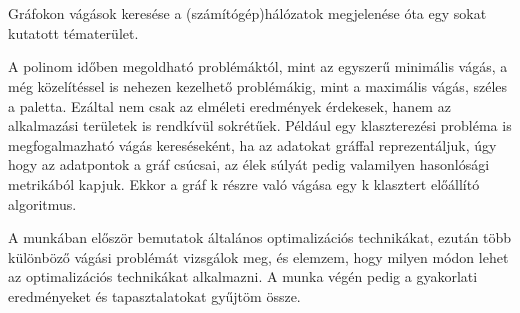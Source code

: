 \chapter{\bevezetes}

Gráfokon vágások keresése a (számítógép)hálózatok megjelenése óta egy sokat kutatott tématerület.

A polinom időben megoldható problémáktól, mint az egyszerű minimális vágás, a még közelítéssel
is nehezen kezelhető problémákig, mint a maximális vágás, széles a paletta. Ezáltal nem csak az elméleti eredmények érdekesek, hanem az alkalmazási területek is rendkívül sokrétűek. Például egy
klaszterezési probléma is megfogalmazható vágás kereséseként, ha az adatokat gráffal reprezentáljuk, úgy hogy az adatpontok a gráf csúcsai, az élek súlyát pedig valamilyen hasonlósági metrikából kapjuk. Ekkor a gráf k részre való vágása egy k klasztert előállító algoritmus.

A munkában először bemutatok általános optimalizációs technikákat, ezután több különböző vágási problémát vizsgálok meg, és elemzem, hogy milyen módon lehet az optimalizációs technikákat alkalmazni.
A munka végén pedig a gyakorlati eredményeket és tapasztalatokat gyűjtöm össze.